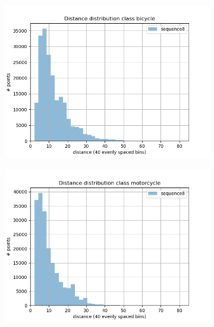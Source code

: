 \begin{figure}[h]
\begin{subfigure}[b]{0.24\textwidth}
     \end{subfigure}
     \begin{subfigure}[b]{0.24\textwidth}
         \centering
         \includegraphics[width=\textwidth]{Figures/Chapter4/dist-height/dist/test/class2.png}
     \end{subfigure}
     \hfill
     \begin{subfigure}[b]{0.24\textwidth}
         \centering
         \includegraphics[width=\textwidth]{Figures/Chapter4/dist-height/dist/test/class3.png}
     \end{subfigure}
     \begin{subfigure}[b]{0.24\textwidth}
         \centering

\end{subfigure}
\end{figure}
